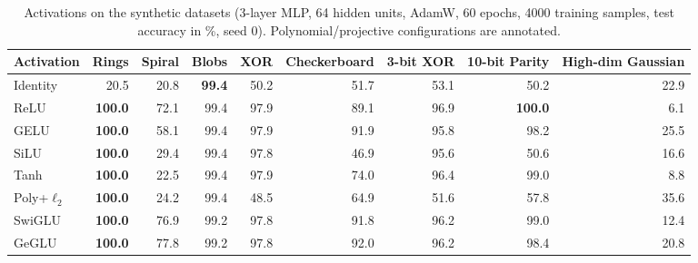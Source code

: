 \begin{table}[t]
\centering
\caption{Activations on the synthetic datasets (3-layer MLP, 64 hidden units, AdamW, 60 epochs, 4000 training samples, test accuracy in \%, seed 0). Polynomial/projective configurations are annotated.}
\label{tab:synth}
\scriptsize
\begin{tabular}{lrrrrrrrr}
\toprule
Activation & Rings & Spiral & Blobs & XOR & Checkerboard & 3-bit XOR & 10-bit Parity & High-dim Gaussian \\
\midrule
Identity & 20.5 & 20.8 & \textbf{99.4} & 50.2 & 51.7 & 53.1 & 50.2 & 22.9 \\
ReLU & \textbf{100.0} & 72.1 & 99.4 & 97.9 & 89.1 & 96.9 & \textbf{100.0} & 6.1 \\
GELU & \textbf{100.0} & 58.1 & 99.4 & 97.9 & 91.9 & 95.8 & 98.2 & 25.5 \\
SiLU & \textbf{100.0} & 29.4 & 99.4 & 97.8 & 46.9 & 95.6 & 50.6 & 16.6 \\
Tanh & \textbf{100.0} & 22.5 & 99.4 & 97.9 & 74.0 & 96.4 & 99.0 & 8.8 \\
Poly+$\ell_2$ & \textbf{100.0} & 24.2 & 99.4 & 48.5 & 64.9 & 51.6 & 57.8 & 35.6 \\
SwiGLU & \textbf{100.0} & 76.9 & 99.2 & 97.8 & 91.8 & 96.2 & 99.0 & 12.4 \\
GeGLU & \textbf{100.0} & 77.8 & 99.2 & 97.8 & 92.0 & 96.2 & 98.4 & 20.8 \\
\bottomrule
\end{tabular}
\end{table}